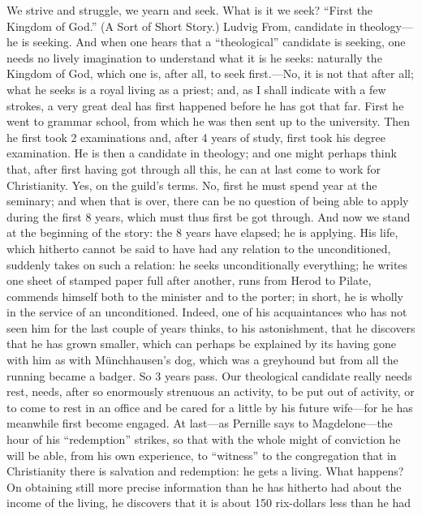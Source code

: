 \documentclass[12pt,a4paper,openany]{book}
\newcommand{\opage}[1]{\marginnote{\footnotesize\textit{[#1]}}}
\begin{document}
We strive and struggle, we yearn and seek. What is it we seek? ``First
the Kingdom of God.'' (A Sort of Short Story.)
Ludvig From, candidate in theology---he is seeking. And when one hears
that a ``theological'' candidate is seeking, one needs no lively
imagination to understand what it is he seeks: naturally the Kingdom of
God, which one is, after all, to seek first.---No, it is not that after
all; what he seeks is a royal living as a priest; and, as I shall
indicate with a few strokes, a very great deal has first happened before
he has got that far. First he went to grammar school, from which he was
then sent up to the university. Then he first took 2 \opage{65}examinations and,
after 4 years of study, first took his degree examination. He is then a
candidate in theology; and one might perhaps think that, after first
having got through all this, he can at last come to work for
Christianity. Yes, on the guild's terms. No, first he must spend
\textonehalf{} year at the seminary; and when that is over, there can be no
question of being able to apply during the first 8 years, which must thus
first be got through. And now we stand at the beginning of the story:
the 8 years have elapsed; he is applying. His life, which hitherto cannot
be said to have had any relation to the unconditioned, suddenly takes on
such a relation: he seeks unconditionally everything; he writes one sheet
of stamped paper full after another, runs from Herod to Pilate, commends
himself both to the minister and to the porter; in short, he is wholly in
the service of an unconditioned. Indeed, one of his acquaintances who has
not seen him for the last couple of years thinks, to his astonishment,
that he discovers that he has grown smaller, which can perhaps be
explained by its having gone with him as with Münchhausen's dog, which
was a greyhound but from all the running became a badger. So 3 years
pass. Our theological candidate really needs rest, needs, after so
enormously strenuous an activity, to be put out of activity, or to come
to rest in an office and be cared for a little by his future wife---for he
has meanwhile first become engaged. At last---as Pernille says to
Magdelone---the hour of his ``redemption'' strikes, so that with the whole
might of conviction he will be able, from his own experience, to
``witness'' to the congregation that in Christianity there is salvation
and redemption: he gets a living. What happens? On obtaining still more
precise \opage{66}information than he has hitherto had about the income of the
living, he discovers that it is about 150 rix-dollars less than he had
\end{document}
